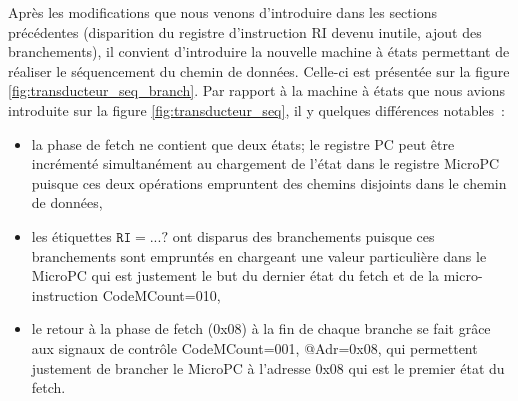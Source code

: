 Après les modifications que nous venons d'introduire dans les sections précédentes (disparition du registre d'instruction RI devenu inutile, ajout des branchements), il convient d'introduire la nouvelle machine à états permettant de réaliser le séquencement du chemin de données. Celle-ci est présentée sur la figure \ref{fig:transducteur_seq_branch}. Par rapport à la machine à états que nous avions introduite sur la figure \ref{fig:transducteur_seq}, il y quelques différences notables~:
\begin{itemize}
\item la phase de fetch ne contient que deux états; le registre PC peut être incrémenté simultanément au chargement de l'état dans le registre MicroPC puisque ces deux opérations empruntent des chemins disjoints dans le chemin de données,
\item les étiquettes $\mathtt{RI}= ...?$ ont disparus des branchements puisque ces branchements sont empruntés en chargeant une valeur particulière dans le MicroPC qui est justement le but du dernier état du fetch et de la micro-instruction CodeMCount=010,
\item le retour à la phase de fetch (0x08) à la fin de chaque branche se fait grâce aux signaux de contrôle CodeMCount=001, @Adr=0x08, qui permettent justement de brancher le MicroPC à l'adresse 0x08 qui est le premier état du fetch.
\end{itemize}

